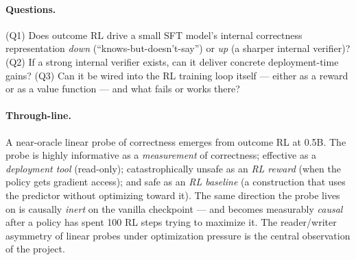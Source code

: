\documentclass[11pt]{article}
\begin{document}
\paragraph{Questions.} (Q1) Does outcome RL drive a small SFT model's internal correctness representation \emph{down} (``knows-but-doesn't-say'') or \emph{up} (a sharper internal verifier)? (Q2) If a strong internal verifier exists, can it deliver concrete deployment-time gains? (Q3) Can it be wired into the RL training loop itself --- either as a reward or as a value function --- and what fails or works there?

\paragraph{Through-line.} A near-oracle linear probe of correctness emerges from outcome RL at 0.5B. The probe is highly informative as a \emph{measurement} of correctness; effective as a \emph{deployment tool} (read-only); catastrophically unsafe as an \emph{RL reward} (when the policy gets gradient access); and safe as an \emph{RL baseline} (a construction that uses the predictor without optimizing toward it). The same direction the probe lives on is causally \emph{inert} on the vanilla checkpoint --- and becomes measurably \emph{causal} after a policy has spent 100 RL steps trying to maximize it. The reader/writer asymmetry of linear probes under optimization pressure is the central observation of the project.
\end{document}
